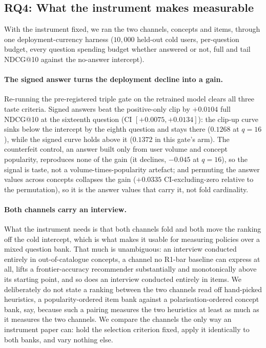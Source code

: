 \documentclass[acmsmall,review,anonymous]{acmart}
\begin{document}
\subsection{RQ4: What the instrument makes measurable}\label{sec:res:concept}

With the instrument fixed, we ran the two channels, concepts and items, through one deployment-currency harness ($10{,}000$ held-out cold users, per-question budget, every question spending budget whether answered or not, full and tail NDCG@10 against the no-answer intercept).

\paragraph{The signed answer turns the deployment decline into a gain.} Re-running the pre-registered triple gate on the retrained model clears all three taste criteria. Signed answers beat the positive-only clip by $+0.0104$ full NDCG@10 at the sixteenth question (CI $[+0.0075,+0.0134]$): the clip-up curve sinks below the intercept by the eighth question and stays there ($0.1268$ at $q{=}16$), while the signed curve holds above it ($0.1372$ in this gate's arm). The counterfeit control, an answer built only from user volume and concept popularity, reproduces none of the gain (it declines, $-0.045$ at $q{=}16$), so the signal is taste, not a volume-times-popularity artefact; and permuting the answer values across concepts collapses the gain ($+0.0335$ CI-excluding-zero relative to the permutation), so it is the answer values that carry it, not fold cardinality.

\paragraph{Both channels carry an interview.} What the instrument needs is that both channels fold and both move the ranking off the cold intercept, which is what makes it usable for measuring policies over a mixed question bank. That much is unambiguous: an interview conducted entirely in out-of-catalogue concepts, a channel no R1-bar baseline can express at all, lifts a frontier-accuracy recommender substantially and monotonically above its starting point, and so does an interview conducted entirely in items. We deliberately do not state a ranking between the two channels read off hand-picked heuristics, a popularity-ordered item bank against a polarisation-ordered concept bank, say, because such a pairing measures the two heuristics at least as much as it measures the two channels. We compare the channels the only way an instrument paper can: hold the selection criterion fixed, apply it identically to both banks, and vary nothing else.
\end{document}
